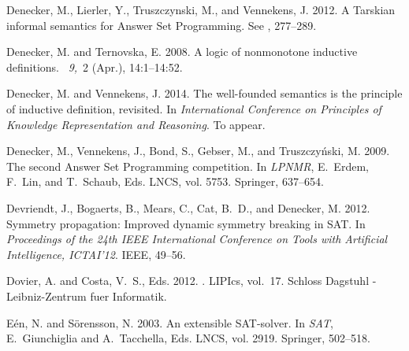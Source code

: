 \documentclass{tlp}
\renewcommand{\|}{\ensuremath{\,|\,}}
\renewcommand{\|}{\,|\,}
\begin{document}
\begin{thebibliography}{}
{\sc Denecker, M.}, {\sc Lierler, Y.}, {\sc Truszczynski, M.}, {\sc and} {\sc
  Vennekens, J.} 2012.
\newblock A {T}arskian informal semantics for {A}nswer {S}et {P}rogramming.
\newblock See , 277--289.

{\sc Denecker, M.} {\sc and} {\sc Ternovska, E.} 2008.
\newblock A logic of nonmonotone inductive definitions.
~{\em 9,\/}~2
  (Apr.), 14:1--14:52.

{\sc Denecker, M.} {\sc and} {\sc Vennekens, J.} 2014.
\newblock The well-founded semantics is the principle of inductive definition,
  revisited.
\newblock In {\em International Conference on Principles of Knowledge
  Representation and Reasoning}.
\newblock To appear.

{\sc Denecker, M.}, {\sc Vennekens, J.}, {\sc Bond, S.}, {\sc Gebser, M.}, {\sc
  and} {\sc Truszczy{\'n}ski, M.} 2009.
\newblock The second {A}nswer {S}et {P}rogramming competition.
\newblock In {\em LPNMR}, {E.~Erdem}, {F.~Lin}, {and} {T.~Schaub}, Eds. LNCS,
  vol. 5753. Springer, 637--654.

{\sc Devriendt, J.}, {\sc Bogaerts, B.}, {\sc Mears, C.}, {\sc Cat, B.~D.},
  {\sc and} {\sc Denecker, M.} 2012.
\newblock Symmetry propagation: Improved dynamic symmetry breaking in {SAT}.
\newblock In {\em Proceedings of the 24th IEEE International Conference on
  Tools with Artificial Intelligence, ICTAI'12}. IEEE, 49--56.

{\sc Dovier, A.} {\sc and} {\sc Costa, V.~S.}, Eds. 2012.
.
  LIPIcs, vol.~17. Schloss Dagstuhl - Leibniz-Zentrum fuer Informatik.

{\sc E{\'e}n, N.} {\sc and} {\sc S{\"o}rensson, N.} 2003.
\newblock An extensible {SAT}-solver.
\newblock In {\em SAT}, {E.~Giunchiglia} {and} {A.~Tacchella}, Eds. LNCS, vol.
  2919. Springer, 502--518.


\end{thebibliography}
\end{document}
